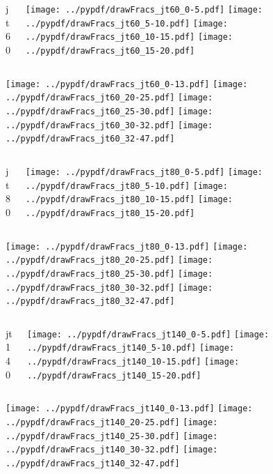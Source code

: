 \documentclass[aspectratio=169]{beamer}
\begin{document}
\begin{figure}[p]
\flushleft
\begin{columns}[T]
\begin{column}{.2\linewidth}
\centering
jt60
\end{column}
\begin{column}{.8\linewidth}
\texttt{[image: ../pypdf/drawFracs\_jt60\_0-5.pdf]}
\texttt{[image: ../pypdf/drawFracs\_jt60\_5-10.pdf]}
\texttt{[image: ../pypdf/drawFracs\_jt60\_10-15.pdf]}
\texttt{[image: ../pypdf/drawFracs\_jt60\_15-20.pdf]}
\end{column}
\end{columns}
\texttt{[image: ../pypdf/drawFracs\_jt60\_0-13.pdf]}
\texttt{[image: ../pypdf/drawFracs\_jt60\_20-25.pdf]}
\texttt{[image: ../pypdf/drawFracs\_jt60\_25-30.pdf]}
\texttt{[image: ../pypdf/drawFracs\_jt60\_30-32.pdf]}
\texttt{[image: ../pypdf/drawFracs\_jt60\_32-47.pdf]}
\end{figure}

\begin{figure}[p]
\flushleft
\begin{columns}[T]
\begin{column}{.2\linewidth}
\centering
jt80
\end{column}
\begin{column}{.8\linewidth}
\texttt{[image: ../pypdf/drawFracs\_jt80\_0-5.pdf]}
\texttt{[image: ../pypdf/drawFracs\_jt80\_5-10.pdf]}
\texttt{[image: ../pypdf/drawFracs\_jt80\_10-15.pdf]}
\texttt{[image: ../pypdf/drawFracs\_jt80\_15-20.pdf]}
\end{column}
\end{columns}
\texttt{[image: ../pypdf/drawFracs\_jt80\_0-13.pdf]}
\texttt{[image: ../pypdf/drawFracs\_jt80\_20-25.pdf]}
\texttt{[image: ../pypdf/drawFracs\_jt80\_25-30.pdf]}
\texttt{[image: ../pypdf/drawFracs\_jt80\_30-32.pdf]}
\texttt{[image: ../pypdf/drawFracs\_jt80\_32-47.pdf]}
\end{figure}

\begin{figure}[p]
\flushleft
\begin{columns}[T]
\begin{column}{.2\linewidth}
\centering
jt140
\end{column}
\begin{column}{.8\linewidth}
\texttt{[image: ../pypdf/drawFracs\_jt140\_0-5.pdf]}
\texttt{[image: ../pypdf/drawFracs\_jt140\_5-10.pdf]}
\texttt{[image: ../pypdf/drawFracs\_jt140\_10-15.pdf]}
\texttt{[image: ../pypdf/drawFracs\_jt140\_15-20.pdf]}
\end{column}
\end{columns}
\texttt{[image: ../pypdf/drawFracs\_jt140\_0-13.pdf]}
\texttt{[image: ../pypdf/drawFracs\_jt140\_20-25.pdf]}
\texttt{[image: ../pypdf/drawFracs\_jt140\_25-30.pdf]}
\texttt{[image: ../pypdf/drawFracs\_jt140\_30-32.pdf]}
\texttt{[image: ../pypdf/drawFracs\_jt140\_32-47.pdf]}
\end{figure}
\end{document}
